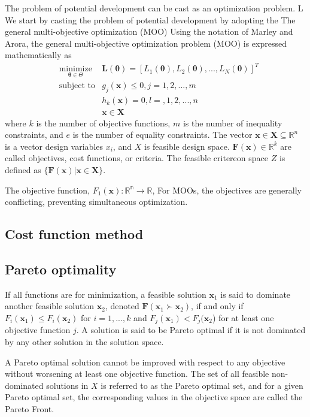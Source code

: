 The problem of potential development can be cast as an optimization problem.  L
We start by casting the problem of potential development by adopting the The general multi-objective optimization (MOO)
Using the notation of Marley and Arora\cite{marler2004_moo_survey}, the general multi-objective optimization problem (MOO) is expressed mathematically as
\begin{align}
  & \underset{\bm{\theta}\in\Theta}{\text{minimize}}
        &\bm{L}(\bm{\theta}) = [
				    L_1(\bm{\theta}),
            L_2(\bm{\theta}),
            ...,
            L_N(\bm{\theta})]^T\\
  & \text{subject to}
        &g_j(\bm{x}) \leq 0, j=1,2,...,m \\
  &     &h_k(\bm{x}) = 0, l=,1,2,...,n \\
  &     &\bm{x} \in \bm{X}
\end{align}
where $k$ is the number of objective functions, $m$ is the number of inequality constraints, and $e$ is the number of equality constraints.
The vector $\bm{x} \in \bm{X} \subseteq \mathbb{R}^n$ is a vector design variables $x_i$, and $X$ is feasible design space.
$\bm{F}(\bm{x}) \in \mathbb{R}^k$ are called objectives, cost functions, or criteria.  The feasible critereon space $Z$ is defined as
$\{\bm{F}(\bm{x}) | \bm{x} \in \bm{X} \}$.

The objective function,
    $F_1(\bm{x}):\mathbb{R^n} \rightarrow \mathbb{R}$,
For MOOs, the objectives are generally conflicting, preventing simultaneous optimization.
\subsection{Cost function method}
\subsection{Pareto optimality}

If all functions are for minimization, a feasible solution $\bm{x}_1$ is said to dominate another feasible solution $\bm{x}_2$, denoted $\bm{F}(\bm{x}_1 \succ \bm{x}_2)$, if and only if $F_i(\bm{x}_1)\leq F_i(\bm{x}_2)$ for $i = 1,...,k$ and $F_j(\bm{x}_1)< F_j(\bm{x}_2$) for at least one objective function $j$.  A solution is said to be Pareto optimal if it is not dominated by any other solution in the solution space.

A Pareto optimal solution cannot be improved with respect to any objective without worsening at least one objective function.  The set of all feasible non-dominated solutions in $X$ is referred to as the Pareto optimal set, and for a given Pareto optimal set, the corresponding values in the objective space are called the Pareto Front.

